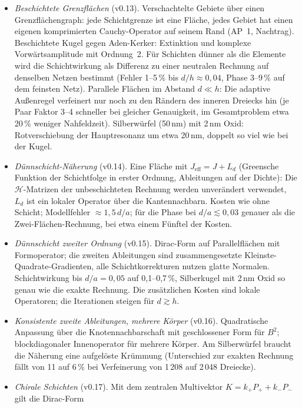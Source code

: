 \documentclass[11pt, a4paper]{article}
\begin{document}
\begin{itemize}[leftmargin=*]
    Rot (grob 440, 460, 470\,nm für 10, 7,5, 5\,nm Radius).
  \item \emph{Beschichtete Grenzflächen} (v0.13). Verschachtelte Gebiete über einen Grenzflächengraph: jede
    Schichtgrenze ist eine Fläche, jedes Gebiet hat einen eigenen komprimierten Cauchy-Operator auf seinem Rand
    (AP~1, Nachtrag). Beschichtete Kugel gegen Aden-Kerker: Extinktion und komplexe Vorwärtsamplitude mit Ordnung~2.
    Für Schichten dünner als die Elemente wird die Schichtwirkung als Differenz zu einer neutralen Rechnung auf
    denselben Netzen bestimmt (Fehler 1--5\,\% bis $d/h\approx0{,}04$, Phase 3--9\,\% auf dem feinsten Netz).
    Parallele Flächen im Abstand $d\ll h$: Die adaptive Außenregel verfeinert nur noch zu den Rändern des inneren
    Dreiecks hin (je Paar Faktor 3--4 schneller bei gleicher Genauigkeit, im Gesamtproblem etwa 20\,\% weniger
    Nahfeldzeit). Silberwürfel (50\,nm) mit 2\,nm Oxid: Rotverschiebung der Hauptresonanz um etwa 20\,nm,
    doppelt so viel wie bei der Kugel.
  \item \emph{Dünnschicht-Näherung} (v0.14). Eine Fläche mit $J_{\mathrm{eff}}=J+L_d$ (Greensche Funktion der
    Schichtfolge in erster Ordnung, Ableitungen auf der Dichte): Die $\mathcal{H}$-Matrizen der unbeschichteten Rechnung
    werden unverändert verwendet, $L_d$ ist ein lokaler Operator über die Kantennachbarn. Kosten wie ohne Schicht;
    Modellfehler $\approx1{,}5\,d/a$; für die Phase bei $d/a\lesssim0{,}03$ genauer als die Zwei-Flächen-Rechnung, bei etwa einem Fünftel der Kosten.
  \item \emph{Dünnschicht zweiter Ordnung} (v0.15). Dirac-Form auf Parallelflächen mit Formoperator; die zweiten
    Ableitungen sind zusammengesetzte Kleinste-Quadrate-Gradienten, alle Schichtkorrekturen nutzen glatte Normalen.
    Schichtwirkung bis $d/a=0{,}05$ auf 0,1--0,7\,\%, Silberkugel mit 2\,nm Oxid so genau wie die exakte Rechnung. Die
    zusätzlichen Kosten sind lokale Operatoren; die Iterationen steigen für $d\gtrsim h$.
  \item \emph{Konsistente zweite Ableitungen, mehrere Körper} (v0.16). Quadratische Anpassung über die
    Knotennachbarschaft mit geschlossener Form für $B^2$; blockdiagonaler Innenoperator für mehrere Körper. Am
    Silberwürfel braucht die Näherung eine aufgelöste Krümmung (Unterschied zur exakten Rechnung fällt von 11 auf 6\,\%
    bei Verfeinerung von 1\,208 auf 2\,048 Dreiecke).
  \item \emph{Chirale Schichten} (v0.17). Mit dem zentralen Multivektor $K=k_+P_++k_-P_-$ gilt die Dirac-Form

\end{itemize}
\end{document}
